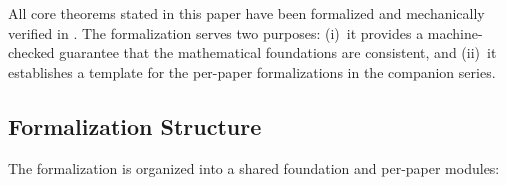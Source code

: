All core theorems stated in this paper have been formalized and
mechanically verified in \LEAN{}.  The formalization serves two
purposes: (i)~it provides a machine-checked guarantee that the
mathematical foundations are consistent, and (ii)~it establishes a
template for the per-paper formalizations in the companion series.

\subsection{Formalization Structure}\label{sec:lean-structure}

The formalization is organized into a shared foundation and
per-paper modules:

